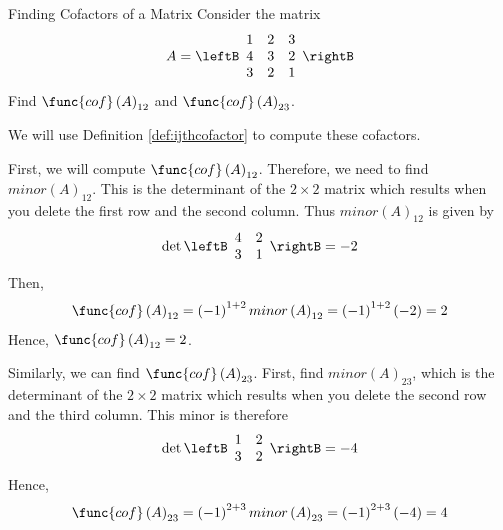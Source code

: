 \begin{example}{Finding Cofactors of a Matrix}\label{exa:findingcofactors}
Consider the matrix
\begin{equation*}
A=\leftB
\begin{array}{rrr}
1 & 2 & 3 \\
4 & 3 & 2 \\
3 & 2 & 1
\end{array}
\rightB 
\end{equation*}
Find $\func{cof}\left( A\right) _{12}$ and $\func{cof}\left( A\right) _{23}$.
\end{example}

\begin{solution} We will use Definition \ref{def:ijthcofactor} to compute these cofactors. 

First, we will compute $\func{cof}\left( A\right) _{12}$. 
Therefore, we need to find $minor\left(A\right)_{12}$. This is the determinant of the $2\times 2$ matrix
which results when you delete the first row and the second column. Thus $minor\left(A\right)_{12}$ is given by 
\begin{equation*}
\det \leftB
\begin{array}{rr}
4 & 2 \\
3 & 1
\end{array}
\rightB = -2
\end{equation*}
Then,
\begin{equation*}
\func{cof}\left( A\right) _{12}=\left( -1\right) ^{1+2} minor\left(A\right)_{12} =\left( -1\right) ^{1+2}\left( -2\right) =2
\end{equation*}
Hence, $\func{cof}\left( A\right) _{12}=2$.

Similarly, we can find $\func{cof}\left( A\right) _{23}$. First, find $minor\left(A\right)_{23}$, which is the determinant of the $2\times 2$ matrix
which results when you delete the second row and the third column. This
minor is therefore
\begin{equation*}
\det \leftB
\begin{array}{rr}
1 & 2 \\
3 & 2
\end{array}
\rightB = -4
\end{equation*}
Hence,
\begin{equation*}
\func{cof}\left( A\right) _{23}=\left( -1\right) ^{2+3} minor\left(A\right)_{23} =\left( -1\right) ^{2+3}\left( -4\right) =4
\end{equation*}
\end{solution}

